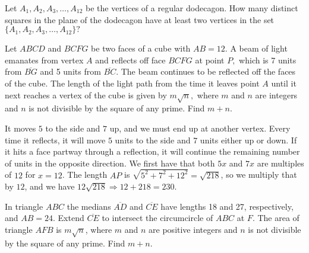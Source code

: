 \documentclass[11pt]{article}
\theoremstyle{definition}
\begin{document}
%	









\begin{question}[name={2002 AIME I, \href{https://artofproblemsolving.com/community/c4p378347}{Problem 5}}]
	Let $A_1, A_2, A_3, \ldots, A_{12}$ be the vertices of a regular dodecagon. How many distinct squares in the plane of the dodecagon have at least two vertices in the set $\{A_1,A_2,A_3,\ldots,A_{12}\}?$	
	
\end{question}

%
%	
%
%





\begin{question}[name={2002 AIME I, \href{https://artofproblemsolving.com/community/c4}{Problem }}]
	Let $ABCD$ and $BCFG$ be two faces of a cube with $AB=12.$ A beam of light emanates from vertex $A$ and reflects off face $BCFG$ at point $P,$ which is 7 units from $\overline{BG}$ and 5 units from $\overline{BC}.$ The beam continues to be reflected off the faces of the cube. The length of the light path from the time it leaves point $A$ until it next reaches a vertex of the cube is given by $m\sqrt{n},$ where $m$ and $n$ are integers and $n$ is not divisible by the square of any prime. Find $m+n.$	
\end{question}


\begin{solution}[name={Solution by JesusFreak197}]
	It moves $5$ to the side and $7$ up, and we must end up at another vertex. Every time it reflects, it will move $5$ units to the side and $7$ units either up or down. If it hits a face partway through a reflection, it will continue the remaining number of units in the opposite direction. We first have that both $5x$ and $7x$ are multiples of $12$ for $x=12$. The length $AP$ is $\sqrt{5^2+7^2+12^2}=\sqrt{218}$, so we multiply that by $12$, and we have $12\sqrt{218}\Rightarrow 12+218=\boxed{230}$.	
\end{solution}




\begin{question}[name={2002 AIME I, \href{https://artofproblemsolving.com/community/c4p296336}{Problem 13}}]
	In triangle $ ABC$ the medians $ \overline{AD}$ and $ \overline{CE}$ have lengths 18 and 27, respectively, and $ AB = 24$. Extend $ \overline{CE}$ to intersect the circumcircle of $ ABC$ at $ F$. The area of triangle $ AFB$ is $ m\sqrt {n}$, where $ m$ and $ n$ are positive integers and $ n$ is not divisible by the square of any prime. Find $ m + n$.
\end{question}
\end{document}
